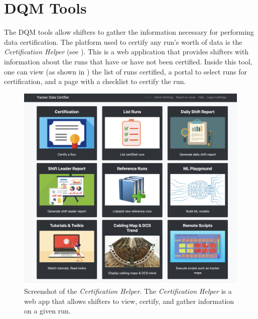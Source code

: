 \section{DQM Tools}
The DQM tools allow shifters to gather the information necessary for performing data certification. The platform used to certify any run's worth of data is the \textit{Certification Helper} (see ). This is a web application that provides shifters with information about the runs that have or have not been certified.
Inside this tool, one can view (as shown in ) the list of runs certified, a portal to select runs for certification, and a page with a checklist to certify the run.

\begin{figure}
	\centering
	\includegraphics[width=.75\linewidth]{Images/certhelper-menu.png}
	\caption[\textit{Certification Helper} webapp.]{Screenshot of the \textit{Certification Helper}. The \textit{Certification Helper} is a web app that allows shifters to view, certify, and gather information on a given run.}
	\label{fig:certhelper}
\end{figure}

